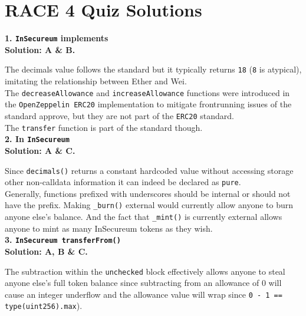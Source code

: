 \section{RACE 4 Quiz Solutions}

\textbf{1. \texttt{InSecureum} implements}\label{sec:race4_q1}\\

\textbf{Solution: A \& B.}

The decimals value follows the standard but it typically returns \verb|18| (\verb|8| is atypical), imitating the relationship between Ether and Wei.\\

The \verb|decreaseAllowance| and \verb|increaseAllowance| functions were introduced in the \verb|OpenZeppelin ERC20| implementation to mitigate frontrunning issues of the standard approve, but they are not part of the \verb|ERC20| standard.\\

The \verb|transfer| function is part of the standard though.\\

\textbf{2. In \texttt{InSecureum}}\label{sec:race4_q2}\\

\textbf{Solution: A \& C.}

Since \verb|decimals()| returns a constant hardcoded value without accessing storage other non-calldata information it can indeed be declared as \verb|pure|.\\

Generally, functions prefixed with underscores should be internal or should not have the prefix.
Making \verb|_burn()| external would currently allow anyone to burn anyone else's balance.
And the fact that \verb|_mint()| is currently external allows anyone to mint as many InSecureum tokens as they wish.\\

\textbf{3. \texttt{InSecureum transferFrom()}}\label{sec:race4_q3}\\

\textbf{Solution: A, B \& C.}

The subtraction within the \verb|unchecked| block effectively allows anyone to steal anyone else's full token balance since subtracting from an allowance of 0 will cause an integer underflow and the allowance value will wrap since \linebreak\verb|0 - 1 == type(uint256).max|).\\

